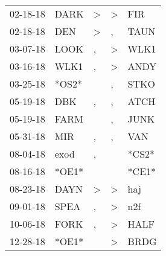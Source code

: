 \begin{supertabular}{p{0.07\textwidth}p{0.06\textwidth}p{0.02\textwidth}p{0.02\textwidth}p{0.06\textwidth}}
          02-18-18\textsuperscript{} &           DARK\textsuperscript{} &     \textgreater &     \textgreater &            FIR\textsuperscript{} \\
          02-18-18\textsuperscript{} &            DEN\textsuperscript{} &     \textgreater &                , &           TAUN\textsuperscript{} \\
          03-07-18\textsuperscript{} &           LOOK\textsuperscript{} &                , &     \textgreater &           WLK1\textsuperscript{} \\
          03-16-18\textsuperscript{} &           WLK1\textsuperscript{} &                , &     \textgreater &           ANDY\textsuperscript{} \\
          03-25-18\textsuperscript{} &                            *OS2* &                  &                , &           STKO\textsuperscript{} \\
          05-19-18\textsuperscript{} &            DBK\textsuperscript{} &                , &                , &           ATCH\textsuperscript{} \\
          05-19-18\textsuperscript{} &           FARM\textsuperscript{} &                  &                , &           JUNK\textsuperscript{} \\
          05-31-18\textsuperscript{} &            MIR\textsuperscript{} &                , &                , &            VAN\textsuperscript{} \\
          08-04-18\textsuperscript{} &           exod\textsuperscript{} &                , &                  &                            *CS2* \\
          08-16-18\textsuperscript{} &                            *OE1* &                  &                  &                            *CE1* \\
          08-23-18\textsuperscript{} &           DAYN\textsuperscript{} &     \textgreater &     \textgreater &            haj\textsuperscript{} \\
          09-01-18\textsuperscript{} &           SPEA\textsuperscript{} &                , &     \textgreater &            n2f\textsuperscript{} \\
          10-06-18\textsuperscript{} &           FORK\textsuperscript{} &                , &     \textgreater &           HALF\textsuperscript{} \\
          12-28-18\textsuperscript{} &                            *OE1* &                  &     \textgreater &           BRDG\textsuperscript{} \\

\end{supertabular}
